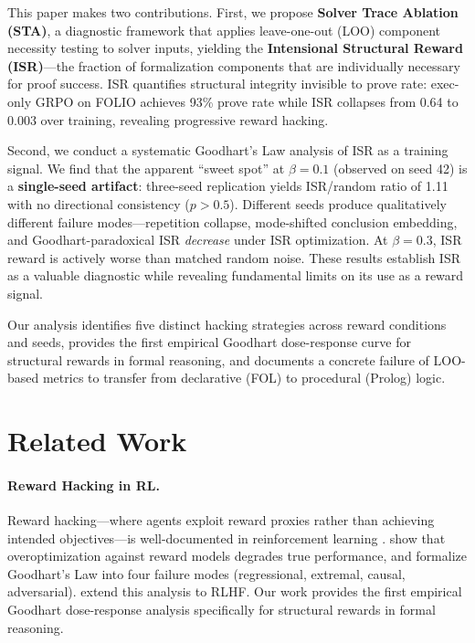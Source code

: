 \documentclass[11pt,a4paper]{article}
\begin{document}
This paper makes two contributions.
First, we propose \textbf{Solver Trace Ablation (STA)}, a diagnostic framework that applies leave-one-out (LOO) component necessity testing to solver inputs, yielding the \textbf{Intensional Structural Reward (ISR)}---the fraction of formalization components that are individually necessary for proof success.
ISR quantifies structural integrity invisible to prove rate: exec-only GRPO on FOLIO achieves 93\% prove rate while ISR collapses from 0.64 to 0.003 over training, revealing progressive reward hacking.

Second, we conduct a systematic Goodhart's Law analysis of ISR as a training signal.
We find that the apparent ``sweet spot'' at $\beta{=}0.1$ (observed on seed 42) is a \textbf{single-seed artifact}: three-seed replication yields ISR/random ratio of 1.11 with no directional consistency ($p > 0.5$).
Different seeds produce qualitatively different failure modes---repetition collapse, mode-shifted conclusion embedding, and Goodhart-paradoxical ISR \emph{decrease} under ISR optimization.
At $\beta{=}0.3$, ISR reward is actively worse than matched random noise.
These results establish ISR as a valuable diagnostic while revealing fundamental limits on its use as a reward signal.

Our analysis identifies five distinct hacking strategies across reward conditions and seeds, provides the first empirical Goodhart dose-response curve for structural rewards in formal reasoning, and documents a concrete failure of LOO-based metrics to transfer from declarative (FOL) to procedural (Prolog) logic.

\section{Related Work}
\label{sec:related}

\paragraph{Reward Hacking in RL.}
Reward hacking---where agents exploit reward proxies rather than achieving intended objectives---is well-documented in reinforcement learning \cite{skalse2022defining, pan2022effects}.
\citet{gao2023scaling} show that overoptimization against reward models degrades true performance, and \citet{manheim2019categorizing} formalize Goodhart's Law into four failure modes (regressional, extremal, causal, adversarial).
\citet{karwowski2024goodhart} extend this analysis to RLHF.
Our work provides the first empirical Goodhart dose-response analysis specifically for structural rewards in formal reasoning.
\end{document}
